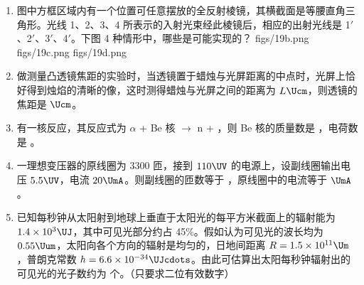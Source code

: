 \documentclass[\gkver]{gaokaozhenti}
\begin{document}
\begin{enumerate}
\item
图中方框区域内有一个位置可任意摆放的全反射棱镜，其横截面是等腰直角三角形。光线 1、2、3、4 所表示的入射光束经此棱镜后，相应的出射光线是 1$'$、2$'$、3$'$、4$'$。下图 4 种情形中，哪些是可能实现的？
{figs/19b.png}
{figs/19c.png}
{figs/19d.png}

\item
做测量凸透镜焦距的实验时，当透镜置于蜡烛与光屏距离的中点时，光屏上恰好得到烛焰的清晰的像，这时测得蜡烛与光屏之间的距离为 $L\Ucm$，则透镜的焦距是 $\Ucm$。

\item
有一核反应，其反应式为 $\alpha$ + Be 核 $\to$ n + ，则 Be 核的质量数是 ，电荷数是 。

\item
一理想变压器的原线圈为 3300 匝，接到 $110\UV$ 的电源上，设副线圈输出电压 $5.5\UV$，电流 $20\UmA$。则副线圈的匝数等于 ，原线圈中的电流等于 $\UmA$。

\item
已知每秒钟从太阳射到地球上垂直于太阳光的每平方米截面上的辐射能为 $1.4\times10^{3}\UJ$，其中可见光部分约占 45\%。假如认为可见光的波长均为 $0.55\Uum$，太阳向各个方向的辐射是均匀的，日地间距离 $R = 1.5\times10^{11}\Um$，普朗克常数 $h = 6.6\times10^{-34}\UJcdots$。由此可估算出太阳每秒钟辐射出的可见光的光子数约为 个。（只要求二位有效数字）


\end{enumerate}
\end{document}
